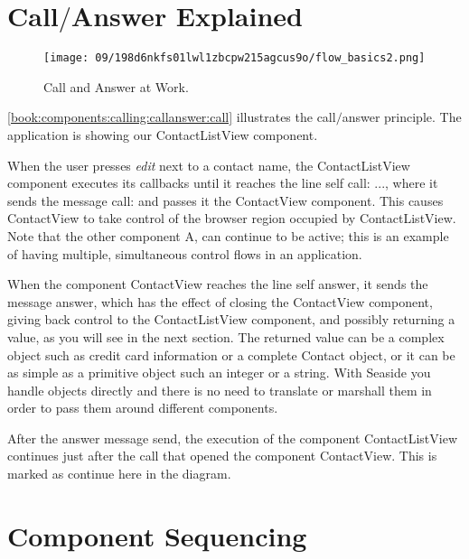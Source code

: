 \documentclass[a4paper,10pt,twoside]{book}
\newcommand{\ct}[1]{{\small\ttfamily\textup{#1}}}
\begin{document}
\section{Call$/$Answer Explained}
\label{book:components:calling:callanswer}

\begin{figure}[h!tbp]
	\begin{center}
		\texttt{[image: 09/198d6nkfs01lwl1zbcpw215agcus9o/flow\_basics2.png]}
		\caption{Call and Answer at Work.\label{book:components:calling:callanswer:call}}
	\end{center}
\end{figure}
   

\autoref{book:components:calling:callanswer:call} illustrates the call$/$answer principle. The application is showing our \ct{ContactListView} component. 

When the user presses \textit{edit} next to a contact name, the \ct{ContactListView} component executes its callbacks until it reaches the line \ct{self call: ...}, where it sends the message \ct{call:} and passes it the \ct{ContactView} component. This causes \ct{ContactView} to take control of the browser region occupied by \ct{ContactListView}. Note that the other component \ct{A}, can continue to be active; this is an example of having multiple, simultaneous control flows in an application. 

When the component \ct{ContactView} reaches the line \ct{self answer}, it sends the message \ct{answer}, which has the effect of closing the \ct{ContactView} component, giving back control to the \ct{ContactListView} component, and possibly returning a value, as you will see in the next section. The returned value can be a complex object such as credit card information or a complete Contact object, or it can be as simple as a primitive object such an integer or a string. With Seaside you handle objects directly and there is no need to translate or marshall them in order to pass them around different components. 

After the \ct{answer} message send, the execution of the component \ct{ContactListView} continues just after the call that opened the component \ct{ContactView}. This is marked as \ct{continue here\symbol{34}} in the diagram.

\section{Component Sequencing}
\label{book:components:calling:sequencing}
\end{document}

